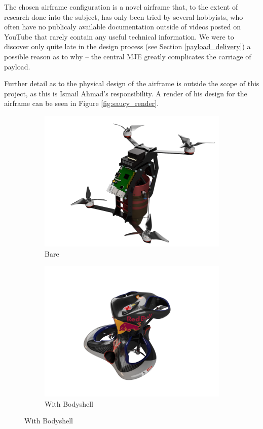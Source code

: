 \documentclass[11pt]{article}
\begin{document}
The chosen airframe configuration is a novel airframe that, to the extent of research done into the subject, has only been tried by several hobbyists, who often have no publicaly available documentation outside of videos posted on YouTube that rarely contain any useful technical information. We were to discover only quite late in the design process (see Section \ref{payload_delivery}) a possible reason as to why – the central MJE greatly complicates the carriage of payload.

Further detail as to the physical design of the airframe is outside the scope of this project, as this is Ismail Ahmad's responsibility.\cite{Ismail_paper} A render of his design for the airframe can be seen in Figure \ref{fig:saucy_render}.

\begin{figure}[h]
    \begin{subfigure}{0.48\textwidth}
        \includegraphics[width=\linewidth]{saucy_render_bare}
        \caption{Bare}
        \label{fig:saucy_render_bare}
    \end{subfigure}\hspace*{\fill}
    \begin{subfigure}{0.48\textwidth}
        \includegraphics[width=\linewidth]{saucy_render_w_bodyshell}
        \caption{With Bodyshell}
        \label{fig:saucy_render_w_bodyshell}
    \end{subfigure}


\end{figure}
\end{document}

